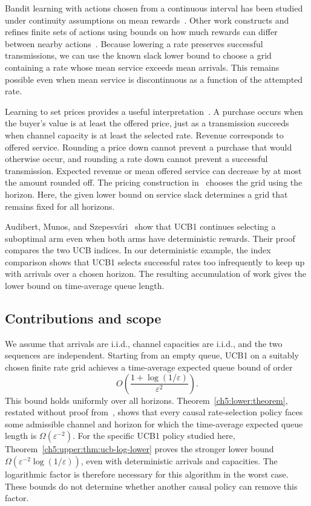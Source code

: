 Bandit learning with actions chosen from a continuous interval has been
studied under continuity assumptions on mean rewards~\cite{Agrawal1995}.
Other work constructs and refines finite sets of actions using bounds on
how much rewards can differ between nearby
actions~\cite{Kleinberg2008,pmlr-v134-podimata21a}.
Because lowering a rate preserves successful transmissions, we can use the
known slack lower bound to choose a grid containing a rate whose mean service
exceeds mean arrivals. This remains possible even when mean service is
discontinuous as a function of the attempted rate.

Learning to set prices provides a useful interpretation~\cite{Kleinberg2003}.
A purchase occurs when the buyer's value is at least the offered price,
just as a transmission succeeds when channel capacity is at least the
selected rate. Revenue corresponds to offered service. Rounding a price
down cannot prevent a purchase that would otherwise occur, and rounding a
rate down cannot prevent a successful transmission. Expected revenue or
mean offered service can decrease by at most the amount rounded off.
The pricing construction in~\cite{Kleinberg2003}
chooses the grid using the horizon. Here, the given lower bound on service
slack determines a grid that remains fixed for all horizons.

Audibert, Munos, and Szepesv{\'a}ri~\cite[Appendix~A.2,
Proposition~1 and Lemma~4]{audibert2009exploration} show that UCB1 continues
selecting a suboptimal arm even when both arms have deterministic
rewards. Their proof compares the two UCB indices. In our deterministic
example, the index comparison shows that UCB1 selects successful rates too
infrequently to keep up with arrivals over a chosen horizon. The resulting
accumulation of work gives the lower bound on time-average queue length.
\subsection{Contributions and scope}
\label{ch5:subsec:contributions}

We assume that arrivals are i.i.d., channel capacities are i.i.d., and the
two sequences are independent. Starting from an empty queue, UCB1 on a
suitably chosen finite rate grid achieves a time-average expected queue
bound of order
\[
O\!\left(\frac{1+\log(1/\varepsilon)}{\varepsilon^2}\right).
\]
This bound holds uniformly over all horizons.
Theorem~\ref{ch5:lower:theorem}, restated without proof
from~\cite{wijewardena2026banditbased}, shows
that every causal rate-selection policy faces some admissible channel and
horizon for which the time-average expected queue length is
$\Omega(\varepsilon^{-2})$. For the specific UCB1 policy studied here,
Theorem~\ref{ch5:upper:thm:ucb-log-lower} proves the stronger lower bound
$\Omega(\varepsilon^{-2}\log(1/\varepsilon))$, even with deterministic
arrivals and capacities. The logarithmic factor is therefore necessary
for this algorithm in the worst case. These bounds do not determine
whether another causal policy can remove this factor.



